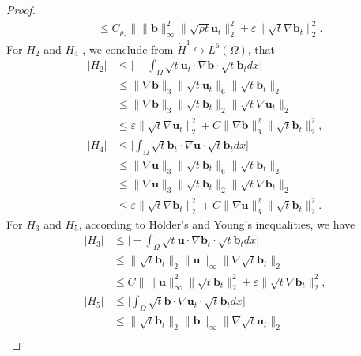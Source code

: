 \documentclass[11pt]{article}
\numberwithin{equation}{section}
\begin{document}
\begin{proof}
\begin{equation}
\begin{split}
&\leq C_{\rho_*}\| \| \mathbf{b} \|_\infty^2\| \sqrt{\rho t}\mathbf{u}_t \|_2^2 + \varepsilon \| \sqrt{t} \nabla \mathbf{b}_t \|_2^2 .
\end{split}
\end{equation}
For $H_2$ and $H_4$ , we conclude from  $\dot{H}^1\hookrightarrow L^6(\Omega)$, that
\begin{equation}
\begin{split}
|H_2 |&\leq \big|-\int_{\Omega}\sqrt{t} \mathbf{u}_t \cdot \nabla \mathbf{b} \cdot \sqrt{t} \mathbf{b}_t dx\big| \\&\leq \| \nabla \mathbf{b} \|_3 \| \sqrt{t} \mathbf{u}_t \|_6 \| \sqrt{t} \mathbf{b}_t \|_2\\
&\leq \| \nabla \mathbf{b} \|_3 \| \sqrt{t} \mathbf{b}_t \|_2 \| \sqrt{t} \nabla \mathbf{u}_t \|_2 \\&\leq \varepsilon \| \sqrt{t} \nabla \mathbf{u}_t \|_2^2 + C \| \nabla \mathbf{b} \|_3^2 \| \sqrt{t} \mathbf{b}_t \|_2^2,\\
|H_4| &\leq \big|\int_{\Omega}\sqrt{t} \mathbf{b}_t \cdot \nabla \mathbf{u} \cdot \sqrt{t} \mathbf{b}_t dx\big| \\&\leq \| \nabla \mathbf{u} \|_3 \| \sqrt{t} \mathbf{b}_t \|_6 \| \sqrt{t} \mathbf{b}_t \|_2\\
&\leq \| \nabla \mathbf{u} \|_3 \| \sqrt{t} \mathbf{b}_t \|_2 \| \sqrt{t} \nabla \mathbf{b}_t \|_2\\& \leq \varepsilon \| \sqrt{t} \nabla \mathbf{b}_t \|_2^2 + C \| \nabla \mathbf{u} \|_3^2 \| \sqrt{t} \mathbf{b}_t \|_2^2.
\end{split}
\end{equation}
For \( H_3\) and \( H_5\),  according to H\"{o}lder's and Young's inequalities,  we have
\begin{equation}
\begin{split}
|H_3 |&\leq \big|-\int_{\Omega}\sqrt{t} \mathbf{u} \cdot \nabla \mathbf{b}_t \cdot \sqrt{t} \mathbf{b}_t dx\big|\\& \leq \| \sqrt{t}\mathbf{b}_t \|_2 \| \mathbf{u} \|_\infty \| \nabla\sqrt{t} \mathbf{b}_t \|_2\\
&\leq C\| \| \mathbf{u} \|_\infty^2\| \sqrt{t}\mathbf{b}_t \|_2^2 + \varepsilon \| \sqrt{t} \nabla \mathbf{b}_t \|_2^2,\\
|H_5| &\leq \big|\int_{\Omega}\sqrt{t} \mathbf{b} \cdot \nabla \mathbf{u}_t \cdot \sqrt{t} \mathbf{b}_t dx\big|\\& \leq \| \sqrt{t}\mathbf{b}_t \|_2 \| \mathbf{b} \|_\infty \| \nabla\sqrt{t} \mathbf{u}_t \|_2\\

\end{split}
\end{equation}
\end{proof}
\end{document}
